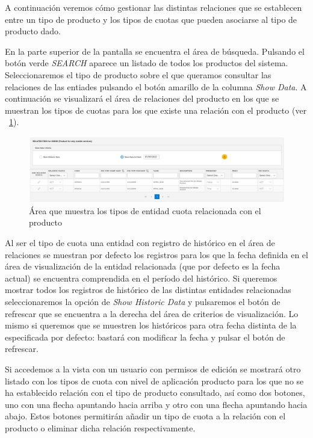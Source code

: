 A continuación veremos cómo gestionar las distintas relaciones que se establecen entre un tipo de producto y los tipos de cuotas que pueden asociarse al tipo de producto dado.


En la parte superior de la pantalla se encuentra el área de búsqueda. Pulsando el botón verde \emph{SEARCH} aparece un listado de todos los productos del sistema. Seleccionaremos el tipo de producto sobre el que queramos consultar las relaciones de las entiades pulsando el botón amarillo de la columna \emph{Show Data}. A continuación se visualizará el área de relaciones del producto en los que se muestran los tipos de cuotas para los que existe una relación con el producto (ver \figurename~\ref{fig:area-relacion-tipos-entidades}).


\begin{figure}[H]
  \centering
  \includegraphics[width=\textwidth]{imaxes/area-relacion-tipos-entidades.png}
  \caption{Área que muestra los tipos de entidad cuota relacionada con el producto}
  \label{fig:area-relacion-tipos-entidades}
\end{figure}



Al ser el tipo de cuota una entidad con registro de histórico en el área de relaciones se muestran por defecto los registros para los que la fecha definida en el área de visualización de la entidad relacionada (que por defecto es la fecha actual) se encuentra comprendida en el período del histórico. Si queremos mostrar todos los registros de histórico de las distintas entidades relacionadas seleccionaremos la opción de \emph{Show Historic Data} y pulsaremos el botón de refrescar que se encuentra a la derecha del área de criterios de visualización. Lo mismo si queremos que se muestren los históricos para otra fecha distinta de la especificada por defecto: bastará con modificar la fecha y pulsar el botón de refrescar.

Si accedemos a la vista con un usuario con permisos de edición se mostrará otro listado con los tipos de cuota con nivel de aplicación producto para los que no se ha establecido relación con el tipo de producto consultado, así como dos botones, uno con una flecha apuntando hacia arriba y otro con una flecha apuntando hacia abajo. Estos botones permitirán añadir un tipo de cuota a la relación con el producto o eliminar dicha relación respectivamente. 



